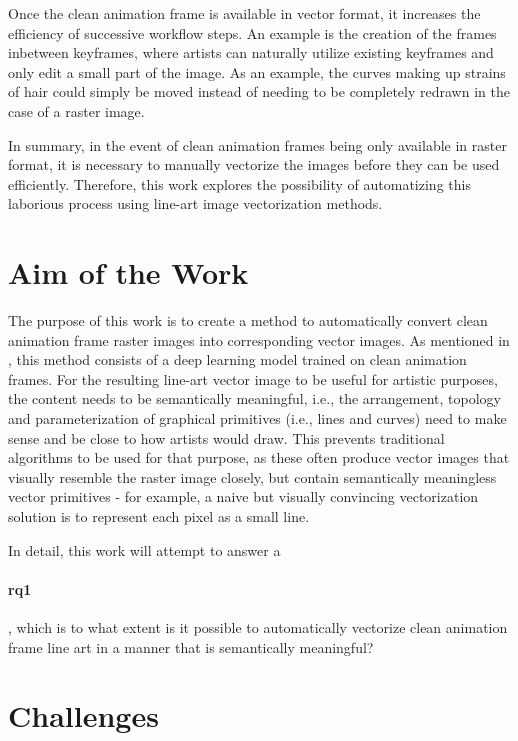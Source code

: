 Once the clean animation frame is available in vector format, it increases the efficiency of successive workflow steps. An example is the creation of the frames inbetween keyframes, where artists can naturally utilize existing keyframes and only edit a small part of the image. As an example, the curves making up strains of hair could simply be moved instead of needing to be completely redrawn in the case of a raster image.

In summary, in the event of clean animation frames being only available in raster format, it is necessary to manually vectorize the images before they can be used efficiently. Therefore, this work explores the possibility of automatizing this laborious process using line-art image vectorization methods. 

\section{Aim of the Work}
\label{sec:intro.problem}

The purpose of this work is to create a method to automatically convert clean animation frame raster images into corresponding vector images. As mentioned in , this method consists of a deep learning model trained on clean animation frames. For the resulting line-art vector image to be useful for artistic purposes, the content needs to be semantically meaningful, i.e., the arrangement, topology and parameterization of graphical primitives (i.e., lines and curves) need to make sense and be close to how artists would draw. This prevents traditional algorithms \citep{Selinger03potrace:a, autotrace, 10.1145/2421636.2421640} to be used for that purpose, as these often produce vector images that visually resemble the raster image closely, but contain semantically meaningless vector primitives - for example, a naive but visually convincing vectorization solution is to represent each pixel as a small line.

In detail, this work will attempt to answer a \paragraph{\gls{rq1}}, which is to what extent is it possible to automatically vectorize clean animation frame line art in a manner that is semantically meaningful?

\section{Challenges}
\label{sec:challenges}

